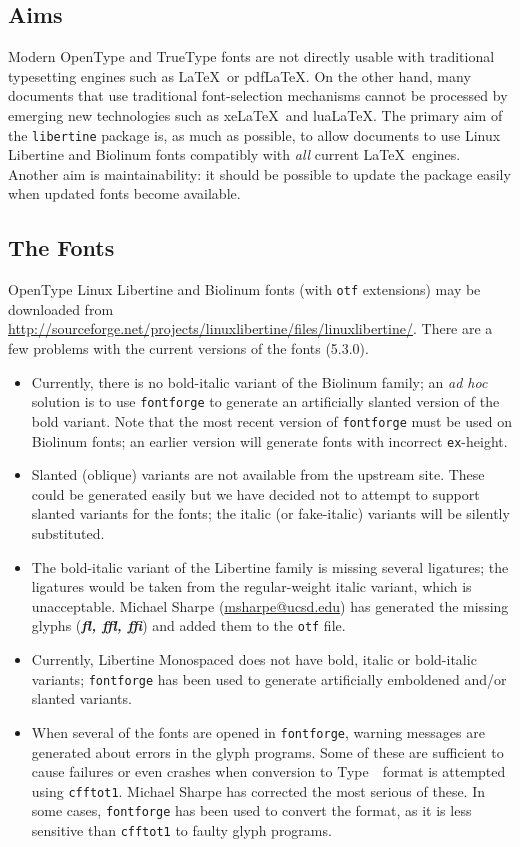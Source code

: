 \documentclass[11pt]{article}
\newcommand{\typeone}{Type~\liningnums{1}}
\begin{document}
\subsection{Aims}

Modern OpenType and TrueType fonts are not directly usable with traditional
typesetting engines such as \LaTeX\ or pdf\LaTeX.  On the other hand, many documents
that use traditional font-selection mechanisms cannot be processed by
emerging new technologies such as xe\LaTeX\ and lua\LaTeX.  The primary aim
of the \texttt{libertine} package is, as much as possible, to allow documents
to use Linux Libertine and Biolinum fonts compatibly with \emph{all} current \LaTeX\
engines.  Another aim is maintainability: it should be possible to update
the package easily when updated fonts become available.

\subsection{The Fonts}

OpenType Linux Libertine and Biolinum fonts (with \texttt{otf} extensions) may be downloaded from
\url{http://sourceforge.net/projects/linuxlibertine/files/linuxlibertine/}.
There are a few problems with the current versions of the fonts (5.3.0).
\begin{itemize}
\item
Currently, there is no bold-italic variant of the Biolinum family; an \emph{ad hoc}
solution is to use \texttt{fontforge} to generate an artificially slanted
version of the bold variant.  Note that the most recent version of \texttt{fontforge}
must be used on Biolinum fonts; an earlier version will generate fonts with incorrect \texttt{ex}-height.
\item Slanted (oblique) variants are not available
from the upstream site.  These could be
generated easily but we have decided not to attempt to support slanted
variants for the fonts; the italic (or fake-italic) variants will be silently substituted.
\item
The bold-italic variant of the Libertine family is missing
several ligatures; the ligatures would be taken from the
regular-weight italic variant, which is unacceptable.
Michael Sharpe (\url{msharpe@ucsd.edu}) has generated
the missing glyphs  (\emph{\bfseries fl, ffl, ffi})  and added them to the \texttt{otf}
file.

\item Currently, Libertine Monospaced does not have bold, italic or bold-italic
variants; \texttt{fontforge} has been used to generate artificially emboldened and/or slanted
variants.

\item
When several of the fonts are opened in \texttt{fontforge}, warning
messages are generated about errors in the glyph programs.  Some of
these are sufficient to cause failures or even crashes when conversion
to \typeone\ format is attempted using \texttt{cfftot1}. Michael
Sharpe has corrected the most serious of these.  In some cases,
\texttt{fontforge}
has been used to convert the format, as it is less sensitive than \texttt{cfftot1}
to faulty glyph programs.
\end{itemize}
\end{document}
